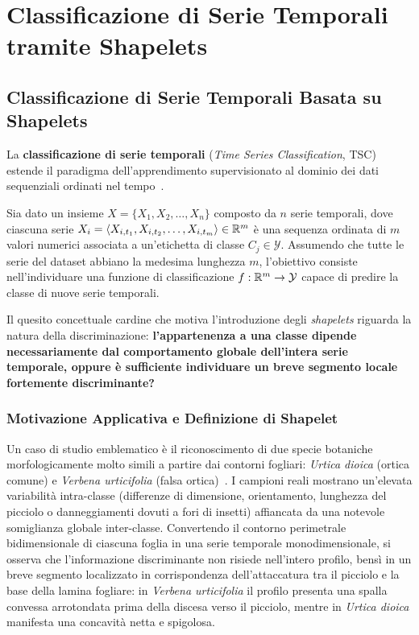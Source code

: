 \chapter{Classificazione di Serie Temporali tramite Shapelets}
\label{ch:dm-shapelets-dt-sim}

\section{Classificazione di Serie Temporali Basata su Shapelets}
\label{sec:dm-shapelets-intro}

La \textbf{classificazione di serie temporali} (\textit{Time Series Classification}, TSC) estende il paradigma dell'apprendimento supervisionato al dominio dei dati sequenziali ordinati nel tempo~\cite{ye2009,tan2018}.

\begin{definition}
Sia dato un insieme $X = \{X_1, X_2, \dots, X_n\}$ composto da $n$ serie temporali, dove ciascuna serie $X_i = \langle X_{i,t_1}, X_{i,t_2}, \dots, X_{i,t_m} \rangle \in \mathbb{R}^m$ \`e una sequenza ordinata di $m$ valori numerici associata a un'etichetta di classe $C_j \in \mathcal{Y}$. Assumendo che tutte le serie del dataset abbiano la medesima lunghezza $m$, l'obiettivo consiste nell'individuare una funzione di classificazione $f : \mathbb{R}^m \rightarrow \mathcal{Y}$ capace di predire la classe di nuove serie temporali.
\end{definition}

Il quesito concettuale cardine che motiva l'introduzione degli \textit{shapelets} riguarda la natura della discriminazione: \textbf{l'appartenenza a una classe dipende necessariamente dal comportamento globale dell'intera serie temporale, oppure \`e sufficiente individuare un breve segmento locale fortemente discriminante?}

\FloatBarrier
\subsection{Motivazione Applicativa e Definizione di Shapelet}
\label{subsec:dm-shapelets-motivation}

Un caso di studio emblematico \`e il riconoscimento di due specie botaniche morfologicamente molto simili a partire dai contorni fogliari: \textit{Urtica dioica} (ortica comune) e \textit{Verbena urticifolia} (falsa ortica)~\cite{ye2009}. I campioni reali mostrano un'elevata variabilit\`a intra-classe (differenze di dimensione, orientamento, lunghezza del picciolo o danneggiamenti dovuti a fori di insetti) affiancata da una notevole somiglianza globale inter-classe. Convertendo il contorno perimetrale bidimensionale di ciascuna foglia in una serie temporale monodimensionale, si osserva che l'informazione discriminante non risiede nell'intero profilo, bens\`i in un breve segmento localizzato in corrispondenza dell'attaccatura tra il picciolo e la base della lamina fogliare: in \textit{Verbena urticifolia} il profilo presenta una spalla convessa arrotondata prima della discesa verso il picciolo, mentre in \textit{Urtica dioica} manifesta una concavit\`a netta e spigolosa.

